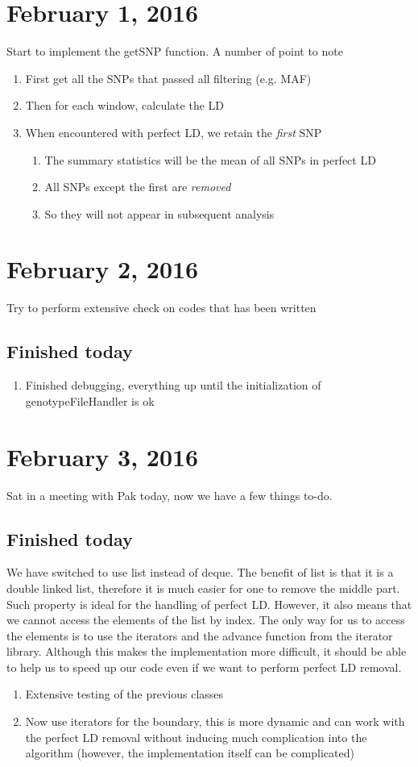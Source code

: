 \documentclass[12pt]{article}
\begin{document}
	\section{February 1, 2016}
	Start to implement the getSNP function. 
	A number of point to note
	\begin{enumerate}
		\item First get all the SNPs that passed all filtering (e.g. MAF)
		\item Then for each window, calculate the LD
		\item When encountered with perfect LD, we retain the \emph{first} SNP
		\begin{enumerate}
			\item The summary statistics will be the mean of all SNPs in perfect LD
			\item All SNPs except the first are \emph{removed} 
			\item So they will not appear in subsequent analysis
		\end{enumerate}
	\end{enumerate}
	
	\section{February 2, 2016}
	Try to perform extensive check on codes that has been written
	\subsection{Finished today}
	\begin{enumerate}
		\item Finished debugging, everything up until the initialization of genotypeFileHandler is ok
	\end{enumerate}
	\section{February 3, 2016}
	Sat in a meeting with Pak today, now we have a few things to-do.
	
	\subsection{Finished today}
	We have switched to use list instead of deque. 
	The benefit of list is that it is a double linked list, therefore it is much easier for one to remove the middle part.
	Such property is ideal for the handling of perfect LD. 
	However, it also means that we cannot access the elements of the list by index. 
	The only way for us to access the elements is to use the iterators and the advance function from the iterator library.
	Although this makes the implementation more difficult, it should be able to help us to speed up our code even if we want to perform perfect LD removal.
	\begin{enumerate}
		\item Extensive testing of the previous classes
		\item Now use iterators for the boundary, this is more dynamic and can work with the perfect LD removal without inducing much complication into the algorithm (however, the implementation itself can be complicated)
	\end{enumerate}
\end{document}
